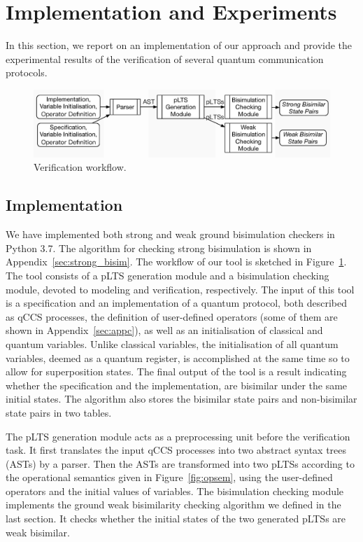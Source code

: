 \documentclass[a4paper,runningheads]{llncs}
\begin{document}
\section{Implementation and Experiments}
\label{sec:experiment}
In this section, we report on an implementation of our approach and provide the experimental results of the verification of several quantum communication protocols. 

\begin{figure}[htbp]
\centering
\includegraphics[width=\textwidth]{images/architecture.eps}
\caption{Verification workflow.}
\label{fig:arch}
\end{figure}

\subsection{Implementation}
We have implemented both strong and weak ground bisimulation checkers in Python 3.7. The algorithm for checking strong bisimulation is shown in Appendix~\ref{sec:strong_bisim}. The workflow of our tool is sketched in Figure~\ref{fig:arch}. The tool consists of a pLTS generation module and a bisimulation checking module, devoted to modeling and verification, respectively.
The input of this tool is a specification and an implementation of a quantum protocol, both described as qCCS processes, the definition of user-defined operators (some of them are shown in  Appendix~\ref{sec:appc}), as well as an initialisation of classical and quantum variables. Unlike classical variables, the initialisation of all quantum variables, deemed as a quantum register, is accomplished at the same time so to allow for superposition states.
The final output of the tool is a result indicating whether the specification and the implementation, are bisimilar under the same initial states. The algorithm also stores the bisimilar state pairs and non-bisimilar state pairs in two tables.
%

The pLTS generation module acts as a preprocessing unit before the verification task. It first translates the input qCCS processes  into two abstract syntax trees (ASTs) by a parser. Then the ASTs are transformed into two pLTSs according to the operational semantics given in Figure~\ref{fig:opsem}, using the user-defined operators and the initial values of variables.
%
The bisimulation checking module implements the ground weak bisimilarity checking algorithm we defined in the last section. It checks whether the initial states of the two generated pLTSs are weak bisimilar. 
\end{document}
